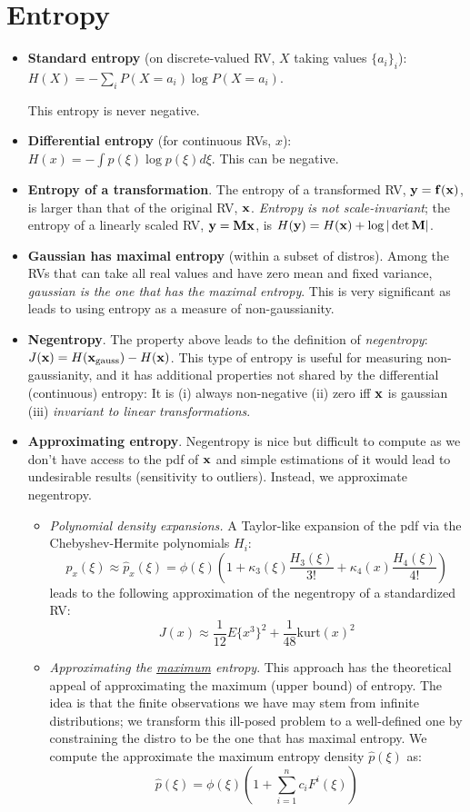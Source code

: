 \documentclass[a4paper]{book}
\begin{document}
\section{Entropy}
\begin{itemize}
\item \textbf{Standard entropy} (\ie on discrete-valued RV, $X$ taking values $\{a_i\}_i$): $H(X)=-\sum_i P(X=a_i)\log P(X=a_i)$.

This entropy is never negative.
\item \textbf{Differential entropy} (for continuous RVs, $x$): $H(x) = -\int p(\xi) \log p(\xi) d\xi$. This can be negative.

\item \textbf{Entropy of a transformation}. The entropy of a transformed RV, \eg $\mathbf{y}=\mathbf{f(x)}$, is larger than that of the original RV, $\mathbf{x}$. \textit{Entropy is not scale-invariant}; the entropy of a linearly scaled RV, $\mathbf{y}=\mathbf{Mx}$, is $H(\mathbf y) = H(\mathbf x) + \log |\det \mathbf M|$.

\item \textbf{Gaussian has maximal entropy} (within a subset of distros). Among the RVs that can take all real values and have zero mean and fixed variance, \textit{gaussian is the one that has the maximal entropy}. This is very significant as leads to using entropy as a measure of non-gaussianity. 

\item \textbf{Negentropy}. The property above leads to the definition of \textit{negentropy}: $J(\mathbf{x})=H(\mathbf x_{\text{gauss}})-H(\mathbf x)$. This type of entropy is useful for measuring non-gaussianity, and it has additional properties not shared by the differential (\ie continuous) entropy:  It is (i) always non-negative (ii) zero iff $\mathbf x$ is gaussian (iii) \textit{invariant to linear transformations}.

\item \textbf{Approximating entropy}. Negentropy is nice but difficult to compute as we don't have access to the pdf of $\mathbf x$ and simple estimations of it would lead to undesirable results (\eg sensitivity to outliers). Instead, we approximate negentropy. 
	\begin{itemize}
	\item \textit{Polynomial density expansions.} A Taylor-like expansion of the pdf via the Chebyshev-Hermite polynomials $H_i$: $$p_x(\xi)\approx \hat{p}_x(\xi)=\phi(\xi)\left(1+\kappa_3(\xi) \frac{H_3(\xi)}{3!} + \kappa_4(x)\frac{H_4(\xi)}{4!}\right)$$
	leads to the following approximation of the negentropy of a standardized RV: $$J(x) \approx \frac{1}{12}E\{x^3\}^2 + \frac{1}{48}\text{kurt}(x)^2$$ 
	\item \textit{Approximating the \underline{maximum} entropy}. This approach has the theoretical appeal of approximating the maximum (\ie upper bound) of entropy. The idea is that the finite observations we have may stem from infinite distributions; we transform this ill-posed problem to a well-defined one by constraining the distro to be the one that has maximal entropy. We compute the approximate the maximum entropy density $\hat{p}(\xi)$ as: $$ \hat{p}(\xi) = \phi(\xi)\left( 1+ \sum\limits_{i=1}^n  c_i F^i (\xi) \right)$$
	

\end{itemize}
\end{itemize}
\end{document}
